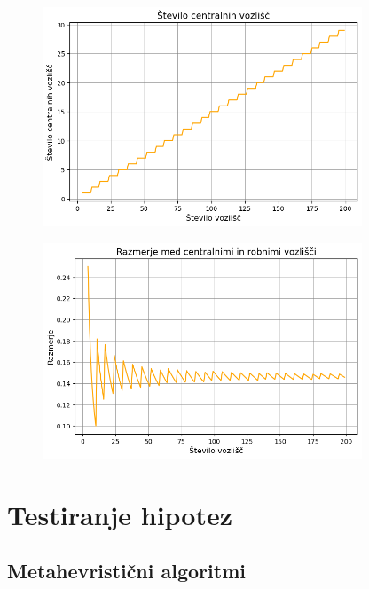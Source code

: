 \documentclass[a4paper,12pt]{article}
\begin{document}
\begin{figure}[h!]
    \centering
    \includegraphics[width=0.85\textwidth]{graf_st_centralnih.png}
\end{figure}

\begin{figure}[h!]
    \centering
    \includegraphics[width=0.85\textwidth]{graf_razmerje_med_centralnimi_in_robnimi.png}
\end{figure}

\section{Testiranje hipotez}
\subsection{Metahevristični algoritmi}
\end{document}
